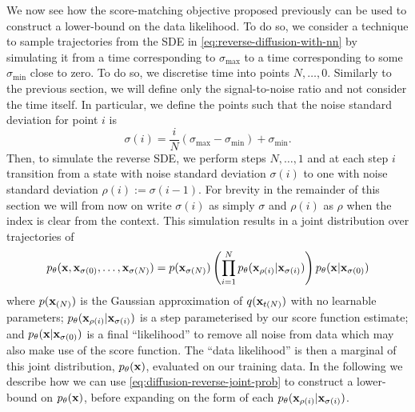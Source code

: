 We now see how the score-matching objective proposed previously can be used to construct a lower-bound on the data likelihood. To do so, we consider a technique to sample trajectories from the SDE in \cref{eq:reverse-diffusion-with-nn} by simulating it from a time corresponding to $\sigma_\text{max}$ to a time corresponding to some $\sigma_\text{min}$ close to zero. To do so, we discretise time into points $N,\ldots,0$. Similarly to the previous section, we will define only the signal-to-noise ratio and not consider the time itself. In particular, we define the points such that the noise standard deviation for point $i$ is
\begin{equation}
    \sigma(i) = \frac{i}{N}(\sigma_\text{max} - \sigma_\text{min}) + \sigma_\text{min}.
\end{equation}
Then, to simulate the reverse SDE, we perform steps $N,\ldots,1$ and at each step $i$ transition from a state with noise standard deviation $\sigma(i)$ to one with noise standard deviation $\rho(i) := \sigma(i-1)$. For brevity in the remainder of this section we will from now on write $\sigma(i)$ as simply $\sigma$ and $\rho(i)$ as $\rho$ when the index is clear from the context. This simulation results in a joint distribution over trajectories of
\begin{align} \label{eq:diffusion-reverse-joint-prob}
    p_\theta({\mathbf{x}},{\mathbf{x}}_{\sigma(0)},\ldots,{\mathbf{x}}_{\sigma(N)}) = p({\mathbf{x}}_{\sigma(N)}) \left( \prod_{i=1}^N p_\theta({\mathbf{x}}_{\rho(i)} | {\mathbf{x}}_{\sigma(i)}) \right) p_\theta({\mathbf{x}}|{\mathbf{x}}_{\sigma(0)})
\end{align}
where $p({\mathbf{x}}_{(N)})$ is the Gaussian approximation of $q({\mathbf{x}}_{t(N)})$ with no learnable parameters; $p_\theta({\mathbf{x}}_{\rho(i)} | {\mathbf{x}}_{\sigma(i)})$ is a step parameterised by our score function estimate; and $p_\theta({\mathbf{x}}|{\mathbf{x}}_{\sigma(0)})$ is a final ``likelihood'' to remove all noise from data which may also make use of the score function. The ``data likelihood'' is then a marginal of this joint distribution, $p_\theta({\mathbf{x}})$, evaluated on our training data. In the following we describe how we can use \cref{eq:diffusion-reverse-joint-prob} to construct a lower-bound on $p_\theta({\mathbf{x}})$, before expanding on the form of each $p_\theta({\mathbf{x}}_{\rho(i)}|{\mathbf{x}}_{\sigma(i)})$.

